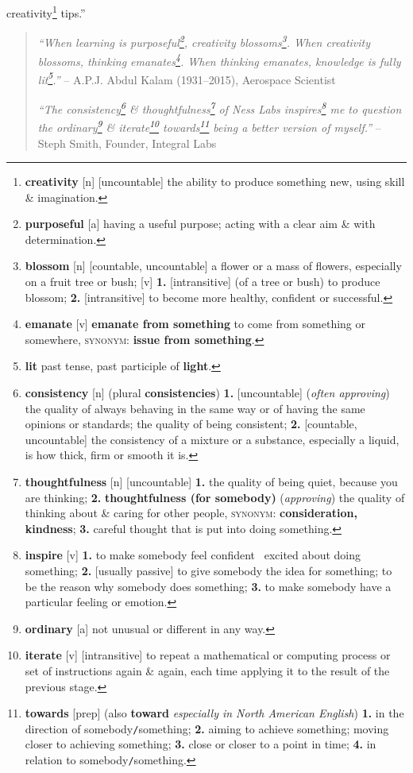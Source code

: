 \documentclass[oneside]{book}
\numberwithin{equation}{section}
\begin{document}
creativity\footnote{\textbf{creativity} [n] [uncountable] the ability to produce something new, using skill \& imagination.} tips.''

\begin{quotation}
	\textit{``When learning is purposeful\footnote{\textbf{purposeful} [a] having a useful purpose; acting with a clear aim \& with determination.}, creativity blossoms\footnote{\textbf{blossom} [n] [countable, uncountable] a flower or a mass of flowers, especially on a fruit tree or bush; [v] \textbf{1.} [intransitive] (of a tree or bush) to produce blossom; \textbf{2.} [intransitive] to become more healthy, confident or successful.}. When creativity blossoms, thinking emanates\footnote{\textbf{emanate} [v] \textbf{emanate from something} to come from something or somewhere, \textsc{synonym}: \textbf{issue from something}.}. When thinking emanates, knowledge is fully lit\footnote{\textbf{lit} past tense, past participle of \textbf{light}.}.''} -- A.P.J. Abdul Kalam (1931--2015), Aerospace Scientist
	
	\textit{``The consistency\footnote{\textbf{consistency} [n] (plural \textbf{consistencies}) \textbf{1.} [uncountable] (\textit{often approving}) the quality of always behaving in the same way or of having the same opinions or standards; the quality of being consistent; \textbf{2.} [countable, uncountable] the consistency of a mixture or a substance, especially a liquid, is how thick, firm or smooth it is.} \& thoughtfulness\footnote{\textbf{thoughtfulness} [n] [uncountable] \textbf{1.} the quality of being quiet, because you are thinking; \textbf{2.} \textbf{thoughtfulness (for somebody)} (\textit{approving}) the quality of thinking about \& caring for other people, \textsc{synonym}: \textbf{consideration, kindness}; \textbf{3.} careful thought that is put into doing something.} of Ness Labs inspires\footnote{\textbf{inspire} [v] \textbf{1.} to make somebody feel confident \ excited about doing something; \textbf{2.} [usually passive] to give somebody the idea for something; to be the reason why somebody does something; \textbf{3.} to make somebody have a particular feeling or emotion.} me to question the ordinary\footnote{\textbf{ordinary} [a] not unusual or different in any way.} \& iterate\footnote{\textbf{iterate} [v] [intransitive] to repeat a mathematical or computing process or set of instructions again \& again, each time applying it to the result of the previous stage.} towards\footnote{\textbf{towards} [prep] (also \textbf{toward} \textit{especially in North American English}) \textbf{1.} in the direction of somebody\texttt{/}something; \textbf{2.} aiming to achieve something; moving closer to achieving something; \textbf{3.} close or closer to a point in time; \textbf{4.} in relation to somebody\texttt{/}something.} being a better version of myself.''} -- Steph Smith, Founder, Integral Labs
	

\end{quotation}
\end{document}
